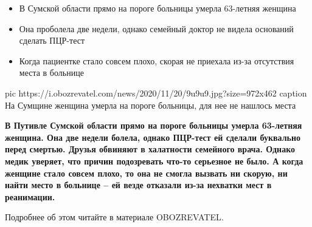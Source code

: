  
 
 

\begin{itemize}
  \item В Сумской области прямо на пороге больницы умерла 63-летняя женщина
  \item Она проболела две недели, однако семейный доктор не видела оснований сделать ПЦР-тест
  \item Когда пациентке стало совсем плохо, скорая не приехала из-за отсутствия места в больнице
\end{itemize}

\ifcmt
pic https://i.obozrevatel.com/news/2020/11/20/9u9u9.jpg?size=972x462
caption На Сумщине женщина умерла на пороге больницы, для нее не нашлось места
\fi

\begin{leftbar}
	\bfseries
В Путивле Сумской области прямо на пороге больницы умерла 63-летняя женщина.
Она две недели болела, однако ПЦР-тест ей сделали буквально перед смертью.
Друзья обвиняют в халатности семейного врача. Однако медик уверяет, что причин
подозревать что-то серьезное не было. А когда женщине стало совсем плохо, то
она не смогла вызвать ни скорую, ни найти место в больнице – ей везде отказали
из-за нехватки мест в реанимации.

Подробнее об этом читайте в материале OBOZREVATEL.
\end{leftbar}


